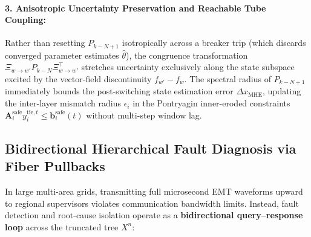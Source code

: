 \documentclass[11pt]{article}
\begin{document}
\paragraph{3. Anisotropic Uncertainty Preservation and Reachable Tube Coupling:}
Rather than resetting $P_{k-N+1}$ isotropically across a breaker trip (which discards converged parameter estimates $\hat{\theta}$), the congruence transformation $\Xi_{w \to w'} P_{k-N} \Xi_{w \to w'}^{\top}$ stretches uncertainty exclusively along the state subspace excited by the vector-field discontinuity $f_{w'} - f_w$. The spectral radius of $P_{k-N+1}$ immediately bounds the post-switching state estimation error $\Delta x_{\mathrm{MHE}}$, updating the inter-layer mismatch radius $\epsilon_i$ in the Pontryagin inner-eroded constraints $\mathbf{A}_i^{\mathrm{safe}} y_i^{\mathrm{tie}, t} \le \mathbf{b}_i^{\mathrm{safe}}(t)$ without multi-step window lag.
\subsection{Bidirectional Hierarchical Fault Diagnosis via Fiber Pullbacks}

In large multi-area grids, transmitting full microsecond EMT waveforms upward to regional supervisors violates communication bandwidth limits. Instead, fault detection and root-cause isolation operate as a \textbf{bidirectional query--response loop} across the truncated tree $X^n$:
\end{document}
